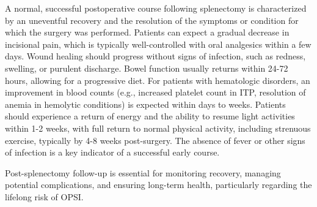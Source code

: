 A normal, successful postoperative course following splenectomy is characterized by an uneventful recovery and the resolution of the symptoms or condition for which the surgery was performed. Patients can expect a gradual decrease in incisional pain, which is typically well-controlled with oral analgesics within a few days. Wound healing should progress without signs of infection, such as redness, swelling, or purulent discharge. Bowel function usually returns within 24-72 hours, allowing for a progressive diet. For patients with hematologic disorders, an improvement in blood counts (e.g., increased platelet count in ITP, resolution of anemia in hemolytic conditions) is expected within days to weeks. Patients should experience a return of energy and the ability to resume light activities within 1-2 weeks, with full return to normal physical activity, including strenuous exercise, typically by 4-8 weeks post-surgery. The absence of fever or other signs of infection is a key indicator of a successful early course.

Post-splenectomy follow-up is essential for monitoring recovery, managing potential complications, and ensuring long-term health, particularly regarding the lifelong risk of OPSI.


